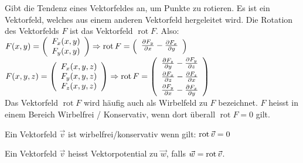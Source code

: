 \begin{definition}
Gibt die Tendenz eines Vektorfeldes an, um Punkte zu rotieren. Es ist ein Vektorfeld, welches aus einem anderen Vektorfeld hergeleitet wird. Die Rotation des Vektorfelds $F$ ist das Vektorfeld $\operatorname{rot} F$. Also: 
$F (x, y) = 
\left(
	\begin{array}{c}
		F_x (x, y) \\
		F_y (x, y)
	\end{array}
\right) \Rightarrow
 \operatorname{rot} F = 
\left(
	\begin{array}{c}
		\vspace{3pt} \frac{\partial F_y}{\partial x} - \frac{\partial F_x}{\partial y}
	\end{array}
\right)$\\
$F(x, y, z) = 
\left(
	\begin{array}{c}
		F_x (x, y, z) \\
		F_y (x, y, z) \\
		F_z (x, y, z)
	\end{array}
\right) \Rightarrow
 \operatorname{rot} F = 
\left(
	\begin{array}{c}
		\vspace{3pt} \frac{\partial F_z}{\partial y} - \frac{\partial F_y}{\partial z} \\
		\vspace{3pt} \frac{\partial F_x}{\partial z} - \frac{\partial F_z}{\partial x} \\
		\frac{\partial F_y}{\partial x} - \frac{\partial F_x}{\partial y}
	\end{array}
\right)$\\
Das Vektorfeld $\operatorname{rot} F$ wird häufig auch als Wirbelfeld zu $F$ bezeichnet. $F$ heisst in einem Bereich Wirbelfrei / Konservativ, wenn dort überall $\operatorname{rot} F = 0$ gilt.
\end{definition}

\begin{definition}
Ein Vektorfeld $\vec{v}$ ist wirbelfrei/konservativ wenn gilt: $\operatorname{rot} \vec{v} = 0$
\end{definition}

\begin{definition}[Vektorpotential]
Ein Vektorfeld $\vec{v}$ heisst Vektorpotential zu $\vec{w}$, falls $\vec{w} = \operatorname{rot} \vec{v}$.
\end{definition}

